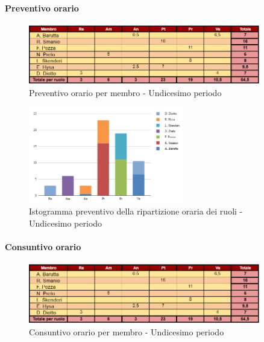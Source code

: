 \paragraph{Preventivo orario}

\begin{figure}[H] 
    \centering
    \includegraphics[width=0.9\textwidth]{../Images/preventivoOrario11Periodo.png}
    \caption{Preventivo orario per membro - Undicesimo periodo}
    \label{fig:Preventivo_orario_11}
\end{figure}

\begin{figure}[H]
    \centering
    \includegraphics[width=0.6\textwidth]{../Images/preventivoDivisioneRuoli11Periodo.png}
    \caption{Istogramma preventivo della ripartizione oraria dei ruoli - Undicesimo periodo}
    \label{fig:Preventivo_ripartizione_oraria_11}
\end{figure}

\paragraph{Consuntivo orario}

\begin{figure}[H]
    \centering
    \includegraphics[width=0.9\textwidth]{../Images/consuntivoOrario11Periodo.png}
    \caption{Consuntivo orario per membro - Undicesimo periodo}
    \label{fig:Constuntivo_orario_11}
\end{figure}


